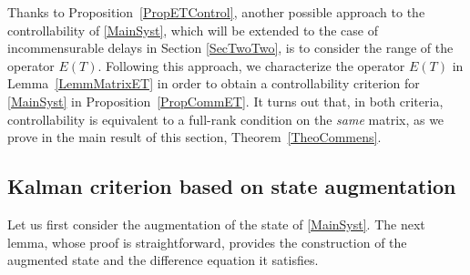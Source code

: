Thanks to Proposition~\ref{PropETControl}, another possible approach to the controllability of \eqref{MainSyst}, which will be extended to the case of incommensurable delays in Section \ref{SecTwoTwo}, is to consider the range of the operator $E(T)$. Following this approach, we characterize the operator $E(T)$ in Lemma~\ref{LemmMatrixET} in order to obtain a controllability criterion for \eqref{MainSyst} in Proposition~\ref{PropCommET}. It turns out that, in both criteria, controllability is equivalent to a full-rank condition on the \emph{same} matrix, as we prove in the main result of this section, Theorem~\ref{TheoCommens}.

\subsection{Kalman criterion based on state augmentation}

Let us first consider the augmentation of the state of \eqref{MainSyst}. The next lemma, whose proof is straightforward, provides the construction of the augmented state and the difference equation it satisfies.


